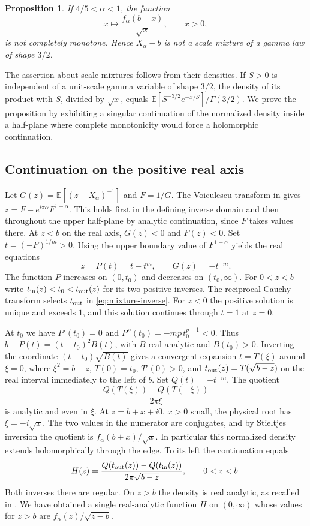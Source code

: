 \documentclass[11pt,a4paper]{article}
\newtheorem{proposition}[theorem]{Proposition}
\numberwithin{equation}{section}
\begin{document}
\begin{proposition}\label{prop:phase-nonmixture}
If $4/5<\alpha<1$, the function
\[
 x\longmapsto \frac{f_\alpha(b+x)}{\sqrt x},\qquad x>0,
\]
is not completely monotone. Hence $X_\alpha-b$ is not a scale
mixture of a gamma law of shape $3/2$.
\end{proposition}

The assertion about scale mixtures follows from their
densities. If $S>0$ is independent of a unit-scale gamma variable of
shape $3/2$, the density of its product with $S$, divided by $\sqrt{x}$,
equals $\mathbb E[S^{-3/2}e^{-x/S}]/\Gamma(3/2)$.
We prove the proposition by exhibiting a singular continuation of
the normalized density inside a half-plane where complete
monotonicity would force a holomorphic continuation.

\subsection{Continuation on the positive real axis}
Let $G(z)=\mathbb E[(z-X_\alpha)^{-1}]$ and $F=1/G$. The
Voiculescu transform in \cite[equation~(2)]{HSW} gives
$z=F-e^{i\pi\alpha}F^{1-\alpha}$.
This holds first in the defining inverse domain and then throughout
the upper half-plane by analytic continuation, since $F$ takes
values there. At $z<b$ on the real axis, $G(z)<0$ and $F(z)<0$.
Set $t=(-F)^{1/m}>0$. Using the upper boundary value of $F^{1-\alpha}$
yields the real equations
\begin{equation}\label{eq:mixture-inverse}
 z=P(t)=t-t^m,\qquad G(z)=-t^{-m}.
\end{equation}
The function $P$ increases on $(0,t_0)$ and decreases on
$(t_0,\infty)$. For $0<z<b$ write $t_{\rm in}(z)<t_0<t_{\rm out}(z)$
for its two positive inverses. The reciprocal Cauchy transform
selects $t_{\rm out}$ in \eqref{eq:mixture-inverse}. For $z<0$
the positive solution is unique and exceeds $1$, and this solution
continues through $t=1$ at $z=0$.

At $t_0$ we have $P'(t_0)=0$ and $P''(t_0)=-mp\,t_0^{p-1}<0$.
Thus $b-P(t)=(t-t_0)^2 B(t)$, with $B$ real analytic and
$B(t_0)>0$. Inverting the coordinate $(t-t_0)\sqrt{B(t)}$ gives
a convergent expansion $t=T(\xi)$ around $\xi=0$, where
$\xi^2=b-z$, $T(0)=t_0$, $T'(0)>0$, and
$t_{\rm out}(z)=T(\sqrt{b-z})$ on the real interval immediately
to the left of $b$. Set $Q(t)=-t^{-m}$. The quotient
\[
 \frac{Q(T(\xi))-Q(T(-\xi))}{2\pi\xi}
\]
is analytic and even in $\xi$. At $z=b+x+i0$, $x>0$ small, the
physical root has $\xi=-i\sqrt x$. The two values in the numerator
are conjugates, and by Stieltjes inversion the quotient is
$f_\alpha(b+x)/\sqrt x$. In particular this normalized density
extends holomorphically through the edge. To its left the
continuation equals
\begin{equation}\label{eq:mixture-branch-difference}
 H(z)=\frac{Q(t_{\rm out}(z))-Q(t_{\rm in}(z))}
                {2\pi\sqrt{b-z}},\qquad 0<z<b .
\end{equation}
Both inverses there are regular. On $z>b$ the density is real
analytic, as recalled in \cite[Section~1]{HSW}. We have obtained a
single real-analytic function $H$ on $(0,\infty)$ whose values for
$z>b$ are $f_\alpha(z)/\sqrt{z-b}$.
\end{document}
